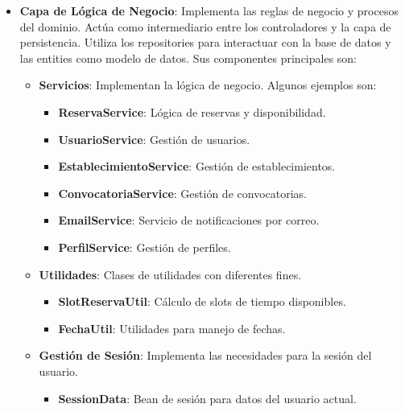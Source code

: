\begin{itemize}
\begin{itemize}
         \end{itemize}

	\item \textbf{Capa de Lógica de Negocio}: Implementa las reglas de negocio y procesos del dominio. Actúa como intermediario entre los controladores y la capa de persistencia. Utiliza los repositories para interactuar con la base de datos y las entities como modelo de datos. Sus componentes principales son:
    	\begin{itemize}
            \item \textbf{Servicios}: Implementan la lógica de negocio. Algunos ejemplos son:
        	\begin{itemize}
                \item \textbf{ReservaService}: Lógica de reservas y disponibilidad.
                \item \textbf{UsuarioService}: Gestión de usuarios.
                \item \textbf{EstablecimientoService}: Gestión de establecimientos.
                \item \textbf{ConvocatoriaService}: Gestión de convocatorias.
                \item \textbf{EmailService}: Servicio de notificaciones por correo.
                \item \textbf{PerfilService}: Gestión de perfiles.
             \end{itemize}

            \item \textbf{Utilidades}: Clases de utilidades con diferentes fines.
        	\begin{itemize}
                \item \textbf{SlotReservaUtil}: Cálculo de slots de tiempo disponibles.
                \item \textbf{FechaUtil}: Utilidades para manejo de fechas.
             \end{itemize}

            \item \textbf{Gestión de Sesión}: Implementa las necesidades para la sesión del usuario.
        	\begin{itemize}
                \item \textbf{SessionData}: Bean de sesión para datos del usuario actual.
             \end{itemize}
         \end{itemize}


\end{itemize}
